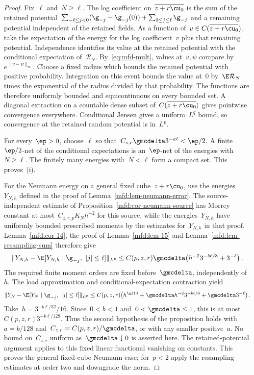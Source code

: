 \documentclass[11pt]{amsart}
\begin{document}
\begin{proof}
Fix~$\ell$ and~$N\geq\ell$. The log coefficient on~$\overline{z+r\cu_0}$ is the sum of the retained potential~$\sum_{-\ell\leq j<0}(\g_{-j}-\g_{-j}(0))+\sum_{0\leq j\leq\ell}\g_{-j}$ and a remaining potential independent of the retained fields. As a function of~$v\in C(\overline{z+r\cu_0})$, take the expectation of the energy for the log coefficient~$v$ plus that remaining potential. Independence identifies its value at the retained potential with the conditional expectation of~$\mathcal R_N$. By~\eqref{eq:mfd-mult}, values at~$v,\psi$ compare by~$e^{\|v-\psi\|_\infty}$. Choose a fixed radius which bounds the retained potential with positive probability. Integration on this event bounds the value at~$0$ by~$\E\mathcal R_N$ times the exponential of the radius divided by that probability. The functions are therefore uniformly bounded and equicontinuous on every bounded set. A diagonal extraction on a countable dense subset of~$C(\overline{z+r\cu_0})$ gives pointwise convergence everywhere. Conditional Jensen gives a uniform~$L^q$ bound, so convergence at the retained random potential is in~$L^p$.

\smallskip

For every~$\ep>0$, choose~$\ell$ so that~$C_{z,r}\gmcdelta3^{-a\ell}<\ep/2$. A finite~$\ep/2$-net of the conditional expectations is an~$\ep$-net of the energies with~$N\geq\ell$. The finitely many energies with~$N<\ell$ form a compact set. This proves~(i).

\smallskip

For the Neumann energy on a general fixed cube~$z+r\cu_0$, use the energies~$Y_{N,h}$ defined in the proof of Lemma~\ref{mfd:lem-neumann-error}. The source-independent estimate of Proposition~\ref{mfd:cor-neumann-source} has Morrey constant at most~$C_{z,r,p}K_Nh^{-2}$ for this source, while the energies~$Y_{N,h}$ have uniformly bounded prescribed moments by the estimates for~$Y_{N,h}$ in that proof. Lemma~\ref{mfd:cor-14}, the proof of Lemma~\ref{mfd:lem-15} and Lemma~\ref{mfd:lem-resampling-sum} therefore give
\begin{equation*}
	\|Y_{N,h}-\E[Y_{N,h}\mid\g_{-j},\ |j|\leq\ell]\|_{L^p}
	\leq C(p,z,r)\gmcdelta\bigl(h^{-2}3^{-b\ell/8}+3^{-\ell}\bigr)\,.
\end{equation*}
The required finite moment orders are fixed before~$\gmcdelta$, independently of~$h$. The load approximation and conditional-expectation contraction yield
\begin{equation*}
	\|Y_N-\E[Y_N\mid\g_{-j},\ |j|\leq\ell]\|_{L^p}
	\leq C(p,z,r)\bigl(h^{\nf14}
	+\gmcdelta h^{-2}3^{-b\ell/8}+\gmcdelta3^{-\ell}\bigr)\,.
\end{equation*}
Take~$h=3^{-b\ell/32}/16$. Since~$0<b<1$ and~$0<\gmcdelta\leq1$, this is at most~$C(p,z,r)3^{-b\ell/128}$. Thus the second hypothesis of the proposition holds with~$a=b/128$ and~$C_{z,r}=C(p,z,r)/\gmcdelta$, or with any smaller positive~$a$. No bound on~$C_{z,r}$ uniform as~$\gmcdelta\downarrow0$ is asserted here. The retained-potential argument applies to this fixed linear functional vanishing on constants. This proves the general fixed-cube Neumann case; for~$p<2$ apply the resampling estimates at order two and downgrade the norm.


\end{proof}
\end{document}
